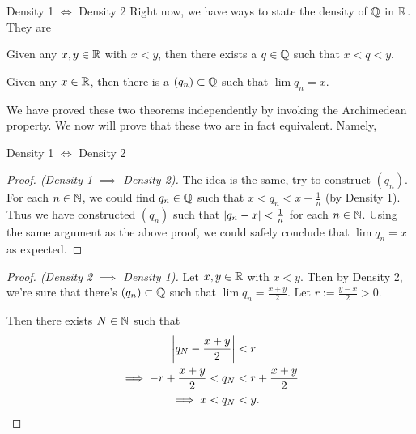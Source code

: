 \documentclass{beamer}
\begin{document}
\begin{frame}{Density 1 $\iff$ Density 2}
  Right now, we have ways to state the density of $\Q$
  in $\R$. They are
  \pause
  \begin{theorem}[Density 1]
    Given any $x,y\in\R$ with $x<y$, then there exists a
    $q\in\Q$ such that $x<q<y$.
  \end{theorem}
  \pause
  \begin{theorem}[Density 2]
    Given any $x\in\R$, then there is a $(q_n)\subset\Q$
    such that $\lim q_n=x$.
  \end{theorem}
  \pause
  We have proved these two theorems independently by invoking
  the Archimedean property. 
  \pause
  We now will prove that these two
  are in fact equivalent. Namely, 
  \begin{center}
    Density 1 $\iff$ Density 2
  \end{center}
\end{frame}
\begin{frame}
  \begin{proof}[Proof. (Density 1 $\implies$ Density 2)]
    \pause
    The idea is the same, try to construct $(q_n)$. For each
    $n\in\N$, we could find $q_n\in\Q$ such that 
    $x<q_n<x+\frac{1}{n}$ (by Density 1).\\[0.3cm]
    \pause
    Thus we have constructed $(q_n)$ such that 
    $\abs{q_n-x}<\frac{1}{n}$ for each $n\in\N$.
    \pause
    Using the same argument as the above proof, we could safely 
    conclude that $\lim q_n=x$ as expected.
  \end{proof}
\end{frame}
\begin{frame}[plain]
  \begin{proof}[Proof. (Density 2 $\implies$ Density 1)]
    \pause
    Let $x,y\in\R$ with $x<y$. Then by Density 2, we're sure that
    there's $(q_n)\subset\Q$ such that $\lim q_n=\frac{x+y}{2}$.
    \pause
    Let $r:=\frac{y-x}{2}>0$. 
    \pause
    \begin{center}
    \end{center}
    \pause
    Then there exists $N\in\N$ such that
    \begin{align*}
      \abs*{q_N-\frac{x+y}{2}}&<r\\
      \implies -r+\frac{x+y}{2}<q_N&<r+\frac{x+y}{2}\\
      \implies x<q_N&<y.
    \end{align*}
  \end{proof}
\end{frame}
\end{document}
